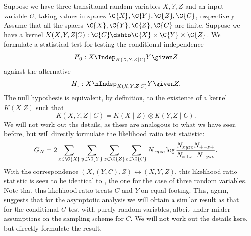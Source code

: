 Suppose we have three transitional random variables $X,Y,Z$ and an input variable $C$,
taking values in spaces $\C{X}, \C{Y}, \C{Z}, \C{C}$, respectively. 
Assume that all the spaces $\C{X},\C{Y},\C{Z},\C{C}$ are finite.
Suppose we have a kernel $K(X,Y,Z|C) : \C{C} \dshto \C{X} \times \C{Y} \times \C{Z}$.
We formulate a statistical test for testing the conditional independence
$$H_0 : X \Indep_{K(X,Y,Z|C)} Y \given Z$$
against the alternative
$$H_1 : X \nIndep_{K(X,Y,Z|C)} Y \given Z.$$
The null hypothesis is equivalent, by definition, to the existence of a kernel $K(X|Z)$ such that
$$K(X,Y,Z \mid C) = K(X \mid Z) \otimes K(Y,Z \mid C).$$
We will not work out the details, as these are analogous to what we have seen before, but will directly formulate
the likelihood ratio test statistic:
\begin{equation}\label{eq:general_G_test_statistic}
  G_N = 2 \sum_{x\in\C{X}}\sum_{y\in\C{Y}}\sum_{z\in\C{Z}}\sum_{c\in\C{C}}
  N_{xyzc} \log \frac{N_{xyzc} N_{++z+}}{N_{x+z+} N_{+yzc}}.
\end{equation}
With the correspondence $(X,(Y,C),Z) \leftrightarrow (X,Y,Z)$, this likelihood
ratio statistic is seen to be identical to , the one for the case
of three random variables. Note that this likelihood ratio treats $C$ and $Y$ on equal footing. 
This, again, suggests that for the asymptotic analysis we will obtain
a similar result as that for the conditional $G$ test with purely random variables, albeit under milder
assumptions on the sampling scheme for $C$. We will not work out the details here, but directly
formulate the result.

